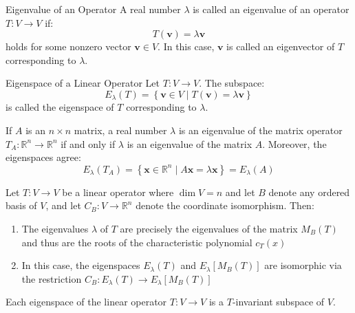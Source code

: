 \documentclass[12pt]{article}
\begin{document}
\begin{definition}{Eigenvalue of an Operator}{}
    A real number $ \lambda $ is called an eigenvalue of an operator $ T : V \to V $ if:
    \[ T \left( \mathbf{v} \right) = \lambda \mathbf{v} \]
    holds for some nonzero vector $ \mathbf{v} \in V $. In this case, $ \mathbf{v} $ is called an eigenvector of $ T $ corresponding to $ \lambda $.
\end{definition}

\begin{definition}{Eigenspace of a Linear Operator}{}
    Let $ T : V \to V $. The subspace:
    \[ E_\lambda \left( T \right) = \left\{ \mathbf{v} \in V \mid T \left( \mathbf{v} \right) = \lambda \mathbf{v} \right\} \]
    is called the eigenspace of $ T $ corresponding to $ \lambda $.
\end{definition}

\begin{theorem}{}{}
    If $ A $ is an $ n \times n $ matrix, a real number $ \lambda $ is an eigenvalue of the matrix operator $ T_A : \mathbb{R}^n \to \mathbb{R}^n $ if and only if $ \lambda $ is an eigenvalue of the matrix $ A $. Moreover, the eigenspaces agree:
    \[ E_\lambda \left( T_A \right) = \left\{ \mathbf{x} \in \mathbb{R}^n \mid A \mathbf{x} = \lambda \mathbf{x} \right\} = E_\lambda \left( A \right) \]
\end{theorem}

\begin{theorem}{}{}
    Let $ T : V \to V $ be a linear operator where $ \dim V = n $ and let $ B $ denote any ordered basis of $ V $, and let $ C_B : V \to \mathbb{R}^n $ denote the coordinate isomorphism. Then:
    \begin{enumerate}[label=(\roman*)]
        \item The eigenvalues $ \lambda $ of $ T $ are precisely the eigenvalues of the matrix $ M_B \left( T \right) $ and thus are the roots of the characteristic polynomial $ c_T \left( x \right) $
        \item In this case, the eigenspaces $ E_\lambda \left( T \right) $ and $ E_\lambda \left[ M_B \left( T \right) \right] $ are isomorphic via the restriction $ C_B : E_\lambda \left( T \right) \to E_\lambda \left[ M_B \left( T \right) \right] $
    \end{enumerate}
\end{theorem}

\begin{theorem}{}{}
    Each eigenspace of the linear operator $ T : V \to V $ is a $ T $-invariant subspace of $ V $.
\end{theorem}
\end{document}
